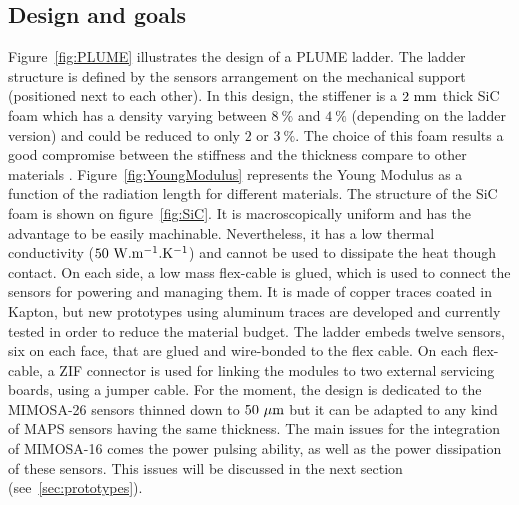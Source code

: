     \subsection{Design and goals}

    Figure~\ref{fig:PLUME} illustrates the design of a PLUME ladder.
    The ladder structure is defined by the sensors arrangement on the mechanical support (positioned next to each other).
    In this design, the stiffener is a $2~\rm{mm}$ thick \gls{SiC} foam which has a density varying between $8~\%$ and $4~\%$ (depending on the ladder version) and could be reduced to only $2$ or $3~\%$.
    The choice of this foam results a good compromise between the stiffness and the thickness compare to other materials \cite{LectureJoel}.
    Figure~\ref{fig:YoungModulus} represents the Young Modulus as a function of the radiation length for different materials.
    The structure of the \gls{SiC} foam is shown on figure~\ref{fig:SiC}.
    It is macroscopically uniform and has the advantage to be easily machinable.
    Nevertheless, it has a low thermal conductivity ($50~\rm{W.m^{-1}.K^{-1}}$) and cannot be used to dissipate the heat though contact.
    On each side, a low mass flex-cable is glued, which is used to connect the sensors for powering and managing them.
    It is made of copper traces coated in Kapton, but new prototypes using aluminum traces are developed and currently tested in order to reduce the material budget.
    The ladder embeds twelve sensors, six on each face, that are glued and wire-bonded to the flex cable.
    On each flex-cable, a \gls{ZIF} connector is used for linking the modules to two external servicing boards, using a jumper cable.
    For the moment, the design is dedicated to the \gls{MIMOSA}-26 sensors thinned down to $50~\rm{\mu m}$ but it can be adapted to any kind of \gls{MAPS} sensors having the same thickness. 
    The main issues for the integration of \gls{MIMOSA}-16 comes the power pulsing ability, as well as the power dissipation of these sensors.
    This issues will be discussed in the next section (see~\ref{sec:prototypes}).


